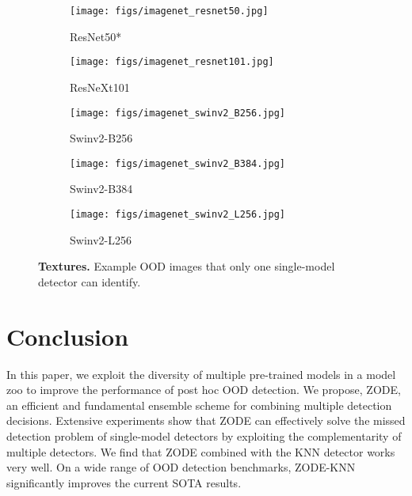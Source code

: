 \documentclass{article} \usepackage{iclr2023_conference,times}
\begin{document}
\begin{figure}[t!]
  \centering
  \begin{subfigure}[b]{0.3\linewidth}
    \texttt{[image: figs/imagenet\_resnet50.jpg]}
     \caption{ResNet50*}
  \end{subfigure}
  \begin{subfigure}[b]{0.36\linewidth}
    \texttt{[image: figs/imagenet\_resnet101.jpg]}
    \caption{ResNeXt101}
  \end{subfigure}
  \begin{subfigure}[b]{0.26\linewidth}
    \texttt{[image: figs/imagenet\_swinv2\_B256.jpg]}
    \caption{Swinv2-B256}
  \end{subfigure}
    \begin{subfigure}[b]{0.34\linewidth}
    \texttt{[image: figs/imagenet\_swinv2\_B384.jpg]}
    \caption{Swinv2-B384}
  \end{subfigure}
  \begin{subfigure}[b]{0.3\linewidth}
    \texttt{[image: figs/imagenet\_swinv2\_L256.jpg]}
    \caption{Swinv2-L256}
  \end{subfigure}
  \caption{ {\bf Textures.} Example OOD images that only one single-model detector can identify.}
  \label{fig2}
\end{figure}






\section{Conclusion}\label{Conclusion}

In this paper, we exploit the diversity of multiple pre-trained models in a model zoo to improve the performance of post hoc OOD detection.
We propose, ZODE, an efficient and fundamental ensemble scheme for combining multiple detection decisions.
Extensive experiments show that ZODE can effectively solve the missed detection problem of single-model detectors by exploiting the complementarity of multiple detectors.
We find that ZODE combined with the KNN detector \citep{sun2022knn} works very well.
On a wide range of OOD detection benchmarks, ZODE-KNN significantly improves the current SOTA results.








\end{document}

